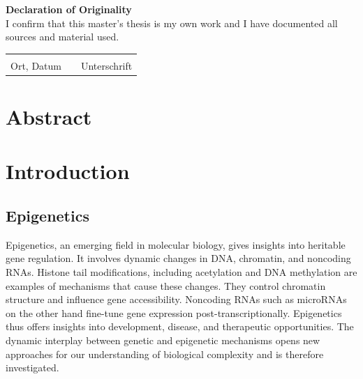 \documentclass[pdftex,12pt,a4paper]{report}
\begin{document}
\newpage
\phantom{oben}
\vfill
\begin{center}
\large\textbf{Declaration of Originality}\normalsize\\
\vspace{0.5cm}
I confirm that this master's thesis is my own work and I have documented all sources and material used.\\
\vspace{1.5cm}
\begin{tabular}{lp{2em}l}
 \hspace{3cm}   && \hspace{3cm} \\\cline{1-1}\cline{3-3}
 Ort, Datum     && Unterschrift
\end{tabular}
\end{center}
\vfill

\tableofcontents

\chapter*{Abstract}

\chapter{Introduction}

\section{Epigenetics}
Epigenetics, an emerging field in molecular biology, gives insights into heritable gene regulation. It involves dynamic changes in DNA, chromatin, and noncoding RNAs. Histone tail modifications, including acetylation and DNA methylation are examples of mechanisms that cause these changes. They control chromatin structure and influence gene accessibility\cite{epigenetics_histone}. Noncoding RNAs such as microRNAs on the other hand fine-tune gene expression post-transcriptionally. Epigenetics thus offers insights into development, disease, and therapeutic opportunities\cite{epigenetics_nonRNA}. The dynamic interplay between genetic and epigenetic mechanisms opens new approaches for our understanding of biological complexity and is therefore investigated.
\end{document}

